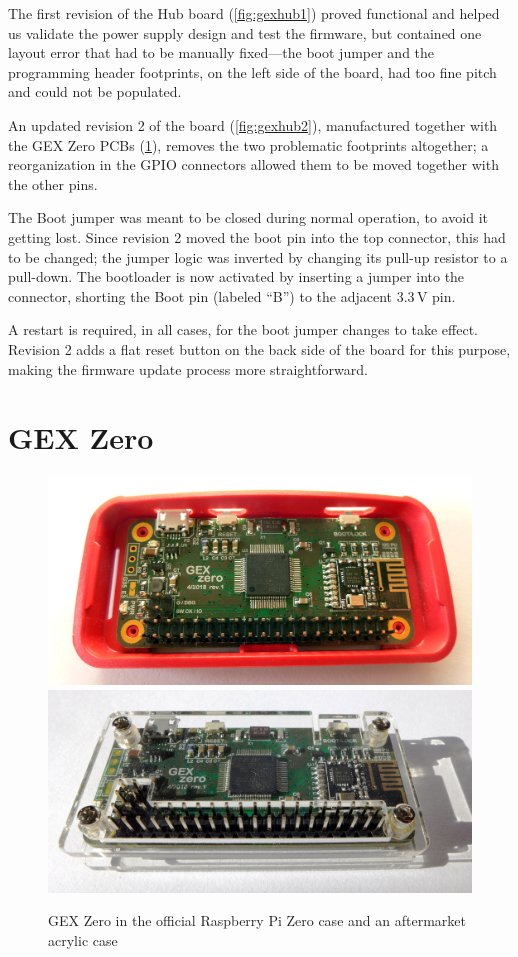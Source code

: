 The first revision of the Hub board (\cref{fig:gexhub1}) proved functional and helped us validate the power supply design and test the firmware, but contained one layout error that had to be manually fixed---the boot jumper and the programming header footprints, on the left side of the board, had too fine pitch and could not be populated.

An updated revision 2 of the board (\cref{fig:gexhub2}), manufactured together with the GEX Zero \glspl{PCB} (\cref{sec:gzero}), removes the two problematic footprints altogether; a reorganization in the \gls{GPIO} connectors allowed them to be moved together with the other pins. 

The Boot jumper was meant to be closed during normal operation, to avoid it getting lost. Since revision 2 moved the boot pin into the top connector, this had to be changed; the jumper logic was inverted by changing its pull-up resistor to a pull-down. The bootloader is now activated by inserting a jumper into the connector, shorting the Boot pin (labeled ``B'') to the adjacent 3.3\,V pin.

A restart is required, in all cases, for the boot jumper changes to take effect. Revision 2 adds a flat reset button on the back side of the board for this purpose, making the firmware update process more straightforward.

\section{GEX Zero}\label{sec:gzero}

\begin{figure}[h]
	\centering
	\includegraphics[width=.85\textwidth]{img/photo-zero-picase.jpg} \\
	\vspace{1mm}
	\includegraphics[width=.85\textwidth]{img/photo-zero-transparent.jpg}
	\caption[The GEX Zero module]{\label{fig:gexzcases}GEX Zero in the official Raspberry Pi Zero case and an aftermarket acrylic case}
\end{figure}

